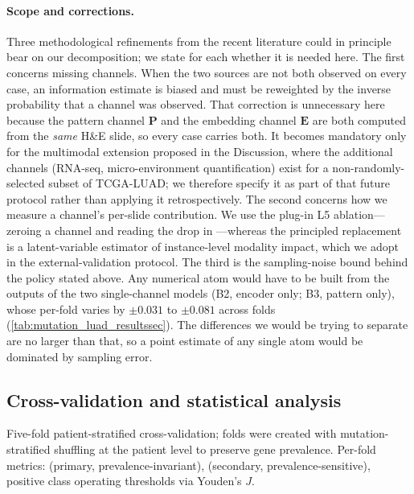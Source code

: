 \paragraph{Scope and corrections.}
Three methodological refinements from the recent literature could in
principle bear on our decomposition; we state for each whether it is
needed here.
The first concerns missing channels. When the two sources are not both
observed on every case, an information estimate is biased and must be
reweighted by the inverse probability that a channel was
observed.\cite{choi2025icym2i} That correction is unnecessary here
because the pattern channel $\mathbf{P}$ and the embedding channel
$\mathbf{E}$ are both computed from the \emph{same} H\&E slide, so every
case carries both. It becomes mandatory only for the multimodal
extension proposed in the Discussion, where the additional channels
(RNA-seq, micro-environment quantification) exist for a
non-randomly-selected subset of TCGA-LUAD; we therefore specify it as
part of that future protocol rather than applying it retrospectively.
The second concerns how we measure a channel's per-slide contribution.
We use the plug-in L5 ablation---zeroing a channel and reading the drop
in \auroc{}---whereas the principled replacement is a latent-variable
estimator of instance-level modality impact,\cite{madaan2026primo} which
we adopt in the external-validation protocol.
The third is the sampling-noise bound behind the policy stated above.
Any numerical atom would have to be built from the outputs of the two
single-channel models (B2, encoder only; B3, pattern only), whose
per-fold \auroc{} varies by $\pm 0.031$ to $\pm 0.081$ across folds
(\cref{tab:mutation_luad_resultssec}). The differences we would be
trying to separate are no larger than that, so a point estimate of any
single atom would be dominated by sampling error.

\subsection*{Cross-validation and statistical analysis}

Five-fold patient-stratified cross-validation; folds were
created with mutation-stratified shuffling at the patient level to
preserve gene prevalence.
Per-fold metrics: \auroc{} (primary, prevalence-invariant),
\auprc{}\cite{davis2006auprc} (secondary, prevalence-sensitive),
positive class operating thresholds via Youden's
$J$.\cite{youden1950index}

